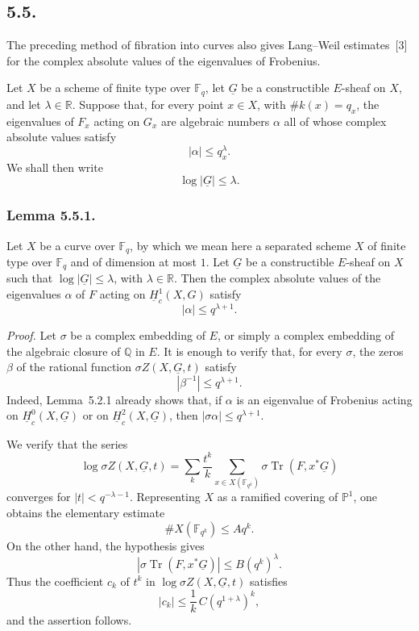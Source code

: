 \subsection*{5.5.}
The preceding method of fibration into curves also gives Lang--Weil
estimates~[3] for the complex absolute values of the eigenvalues of
Frobenius.

Let $X$ be a scheme of finite type over $\mathbb F_q$, let $\underline G$
be a constructible $E$-sheaf on $X$, and let $\lambda\in\mathbb R$.  Suppose
that, for every point $x\in X$, with $\#k(x)=q_x$, the eigenvalues of $F_x$
acting on $G_x$ are algebraic numbers $\alpha$ all of whose complex absolute
values satisfy
\[
|\alpha|\leq q_x^\lambda.
\]
We shall then write
\[
\log|\underline G|\leq\lambda.
\]

\subsubsection*{Lemma 5.5.1.}
Let $X$ be a curve over $\mathbb F_q$, by which we mean here a separated
scheme $X$ of finite type over $\mathbb F_q$ and of dimension at most $1$.
Let $\underline G$ be a constructible $E$-sheaf on $X$ such that
$\log|\underline G|\leq\lambda$, with $\lambda\in\mathbb R$.  Then the
complex absolute values of the eigenvalues $\alpha$ of $F$ acting on
$\underline H_c^1(X,G)$ satisfy
\[
|\alpha|\leq q^{\lambda+1}.
\]

\medskip
\noindent\emph{Proof.}
Let $\sigma$ be a complex embedding of $E$, or simply a complex embedding of
the algebraic closure of $\mathbb Q$ in $E$.  It is enough to verify that,
for every $\sigma$, the zeros $\beta$ of the rational function
$\sigma Z(X,\underline G,t)$ satisfy
\[
|\beta^{-1}|\leq q^{\lambda+1}.
\]
Indeed, Lemma~5.2.1 already shows that, if $\alpha$ is an eigenvalue of
Frobenius acting on $\underline H_c^0(X,\underline G)$ or on
$\underline H_c^2(X,\underline G)$, then
$|\sigma\alpha|\leq q^{\lambda+1}$.

We verify that the series
\[
\log\sigma Z(X,\underline G,t)
=\sum_k\frac{t^k}{k}
  \sum_{x\in X(\mathbb F_{q^k})}
  \sigma\operatorname{Tr}(F,x^*\underline G)
\]
converges for $|t|<q^{-\lambda-1}$.  Representing $X$ as a ramified covering
of $\mathbb P^1$, one obtains the elementary estimate
\[
\#X(\mathbb F_{q^k})\leq A q^k.
\]
On the other hand, the hypothesis gives
\[
\left|\sigma\operatorname{Tr}(F,x^*\underline G)\right|
\leq B(q^k)^\lambda.
\]
Thus the coefficient $c_k$ of $t^k$ in
$\log\sigma Z(X,\underline G,t)$ satisfies
\[
|c_k|\leq\frac{1}{k}\,C(q^{1+\lambda})^k,
\]
and the assertion follows.

